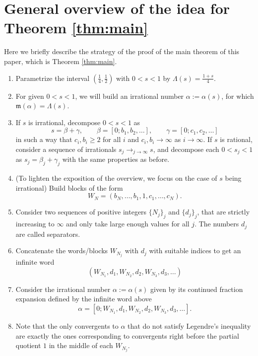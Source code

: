 \documentclass[11pt]{amsart}
\begin{document}
\section{General overview of the idea for Theorem \ref{thm:main}}
Here we briefly describe the strategy of the proof of the main theorem of this paper, which is Theorem \ref{thm:main}.

\begin{enumerate}
    \item Parametrize the interval $(\frac14,\frac12)$ with $0<s<1$ by $\Lambda(s)=\frac{1+s}{4}$.

    \item For given $0<s<1$, we will build an irrational number $\alpha:=\alpha(s)$, for which $\mathfrak{m}(\alpha)=\Lambda(s)$.

    \item If $s$ is irrational, decompose $0<s<1$ as $$
        s=\beta+\gamma,
        \qquad
        \beta=[0;b_1,b_2,\ldots],
        \qquad
        \gamma=[0;c_1,c_2,\ldots]
$$
in such a way that $c_i,b_i\geq2$ for all $i$ and $c_i,b_i\to\infty$ as $i\to\infty$. If $s$ is rational, consider a sequence of irrationals $s_j\to_{j\to\infty}s$, and decompose each $0<s_j<1$ as $s_j=\beta_j+\gamma_j$ with the same properties as before.

\item (To lighten the exposition of the overview, we focus on the case of $s$ being irrational)
Build blocks of the form 
$$
        W_N=(b_N,\ldots,b_1,1,c_1,\ldots,c_N).
$$

\item Consider two sequences of positive integers $\{N_j\}_j$ and $\{d_j\}_j$, that are strictly increasing to $\infty$ and only take large enough values for all $j$. The numbers $d_j$ are called separators.

\item Concatenate the words/blocks $W_{N_j}$ with $d_j$ with suitable indices to get an infinite word
$$
(W_{N_1},d_1,W_{N_2},d_2,W_{N_3},d_3,\ldots)
$$

\item Consider the irrational number $\alpha:=\alpha(s)$ given by its continued fraction expansion defined by the infinite word above
$$
        \alpha=[0;W_{N_1},d_1,W_{N_2},d_2,W_{N_3},d_3,\ldots].
$$
\item Note that the only convergents to $\alpha$ that do not satisfy Legendre's inequality are exactly the ones corresponding to convergents right before the partial quotient $1$ in the middle of each $W_{N_j}$.


\end{enumerate}
\end{document}
